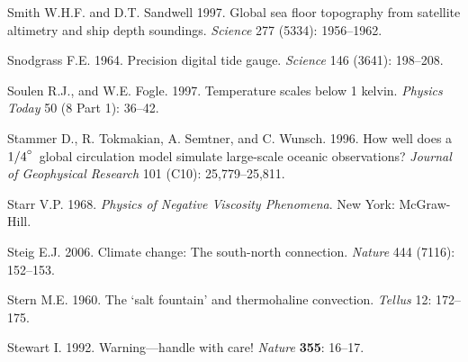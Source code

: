 \begin{thebibliography}{999}
Smith W.H.F. and D.T. Sandwell 1997. Global sea floor topography from
satellite altimetry and ship depth soundings. \textit{Science} 277
(5334): 1956--1962.
%

Snodgrass F.E.  1964. Precision digital tide gauge. \textit{Science}
146 (3641): 198--208.
%

Soulen R.J., and W.E. Fogle.  1997. Temperature scales below 1
kelvin. \textit{Physics Today} 50 (8 Part 1): 36--42.
%

Stammer D., R. Tokmakian, A. Semtner, and C. Wunsch.  1996. How well
does a ${1/4}^\circ$~global circulation model simulate large-scale
oceanic observations? \textit{Journal of Geophysical Research} 101
(C10): 25,779--25,811.
%

Starr V.P.  1968. \textit{Physics of Negative Viscosity Phenomena}.
New York: McGraw-Hill.
%

Steig E.J.  2006. Climate change: The south-north
connection. \textit{Nature} 444 (7116): 152--153.
%

Stern M.E.  1960. The `salt fountain' and thermohaline
convection. \textit{Tellus} 12: 172--175.
%

Stewart I.  1992. Warning---handle with care! \textit{Nature}
\textbf{355}: 16--17.
%


\end{thebibliography}
